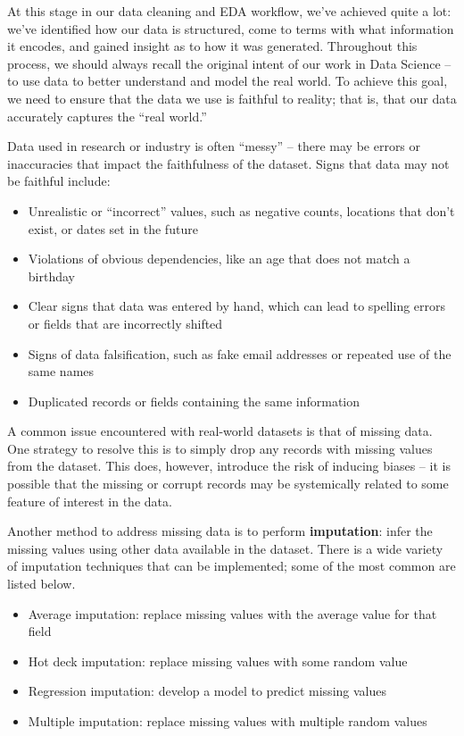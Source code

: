 \documentclass[
  letterpaper,
  DIV=11,
  numbers=noendperiod]{scrreprt}
\providecommand{\tightlist}{%
  \setlength{\itemsep}{0pt}\setlength{\parskip}{0pt}}\usepackage{longtable,booktabs,array}
\begin{document}
At this stage in our data cleaning and EDA workflow, we've achieved
quite a lot: we've identified how our data is structured, come to terms
with what information it encodes, and gained insight as to how it was
generated. Throughout this process, we should always recall the original
intent of our work in Data Science -- to use data to better understand
and model the real world. To achieve this goal, we need to ensure that
the data we use is faithful to reality; that is, that our data
accurately captures the ``real world.''

Data used in research or industry is often ``messy'' -- there may be
errors or inaccuracies that impact the faithfulness of the dataset.
Signs that data may not be faithful include:

\begin{itemize}
\tightlist
\item
  Unrealistic or ``incorrect'' values, such as negative counts,
  locations that don't exist, or dates set in the future
\item
  Violations of obvious dependencies, like an age that does not match a
  birthday
\item
  Clear signs that data was entered by hand, which can lead to spelling
  errors or fields that are incorrectly shifted
\item
  Signs of data falsification, such as fake email addresses or repeated
  use of the same names
\item
  Duplicated records or fields containing the same information
\end{itemize}

A common issue encountered with real-world datasets is that of missing
data. One strategy to resolve this is to simply drop any records with
missing values from the dataset. This does, however, introduce the risk
of inducing biases -- it is possible that the missing or corrupt records
may be systemically related to some feature of interest in the data.

Another method to address missing data is to perform
\textbf{imputation}: infer the missing values using other data available
in the dataset. There is a wide variety of imputation techniques that
can be implemented; some of the most common are listed below.

\begin{itemize}
\tightlist
\item
  Average imputation: replace missing values with the average value for
  that field
\item
  Hot deck imputation: replace missing values with some random value
\item
  Regression imputation: develop a model to predict missing values
\item
  Multiple imputation: replace missing values with multiple random
  values
\end{itemize}
\end{document}
